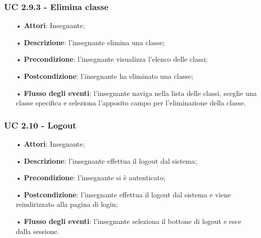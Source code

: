 \subsubsection{UC 2.9.3 - Elimina classe}
\begin{itemize}
	\item[•] \textbf{Attori}: Insegnante;
	\item[•] \textbf{Descrizione}: l'insegnante elimina una classe;
	\item[•] \textbf{Precondizione}: l'insegnante visualizza l'elenco delle classi;
	\item[•] \textbf{Postcondizione}: l'insegnante ha eliminato una classe;
	\item[•] \textbf{Flusso degli eventi}:  l'insegnante naviga nella lista delle classi, sceglie una classe specifica e seleziona l'apposito campo per l'eliminazione della classe.
\end{itemize}

\subsubsection{UC 2.10 - Logout}
\begin{itemize}
	\item[•] \textbf{Attori}: Insegnante;
	\item[•] \textbf{Descrizione}:  l'insegnante effettua il logout dal sistema;
	\item[•] \textbf{Precondizione}: l'insegnante si è autenticato;
	\item[•] \textbf{Postcondizione}: l’insegnante effettua il logout dal sistema e viene reindirizzato alla pagina di login;
	\item[•] \textbf{Flusso degli eventi}: l’insegnante seleziona il bottone di logout e esce dalla sessione.
\end{itemize}

